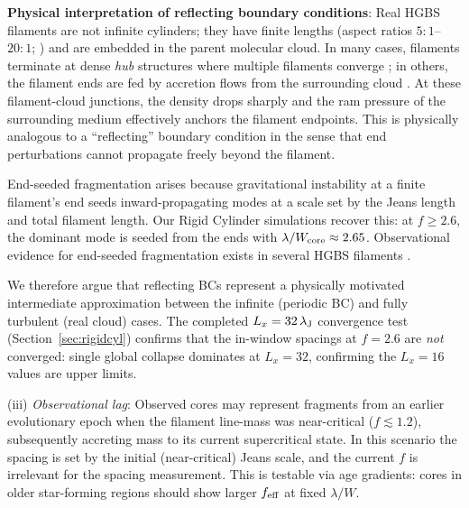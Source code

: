 \documentclass[twoside,twocolumn]{mnras}
\begin{document}
\textbf{Physical interpretation of reflecting boundary conditions}: Real HGBS filaments
are not infinite cylinders; they have finite lengths (aspect ratios $5:1$--$20:1$;
\citealt{Arzoumanian2019}) and are embedded in the parent molecular cloud. In many cases,
filaments terminate at dense \textit{hub} structures where multiple filaments converge
\citep{Andre2010}; in others, the filament ends are fed by accretion flows from the
surrounding cloud \citep{Inutsuka1997, Pineda2023}. At these filament-cloud junctions,
the density drops sharply and the ram pressure of the surrounding medium effectively
anchors the filament endpoints. This is physically analogous to a ``reflecting'' boundary
condition in the sense that end perturbations cannot propagate freely beyond the
filament.

End-seeded fragmentation arises because gravitational instability at a finite filament's end seeds inward-propagating modes at a scale set by the Jeans length and total filament length. Our Rigid Cylinder simulations recover this: at $f \geq 2.6$, the dominant mode is seeded from the ends with $\lambda/W_{\rm core} \approx 2.65$. Observational evidence for end-seeded fragmentation exists in several HGBS filaments \citep{Pineda2023, Andre2010}.

We therefore argue that reflecting BCs represent a physically motivated intermediate
approximation between the infinite (periodic BC) and fully turbulent (real cloud) cases.
The completed $L_x = 32\,\lambda_{\rm J}$ convergence test (Section~\ref{sec:rigidcyl}) confirms
that the in-window spacings at $f = 2.6$ are \textit{not} converged: single global collapse
dominates at $L_x = 32$, confirming the $L_x = 16$ values are upper limits.

(iii) \textit{Observational lag}: Observed cores may represent fragments from an earlier evolutionary epoch when the filament line-mass was near-critical ($f \lesssim 1.2$), subsequently accreting mass to its current supercritical state. In this scenario the spacing is set by the initial (near-critical) Jeans scale, and the current $f$ is irrelevant for the spacing measurement. This is testable via age gradients: cores in older star-forming regions should show larger $f_{\rm eff}$ at fixed $\lambda/W$.
\end{document}
